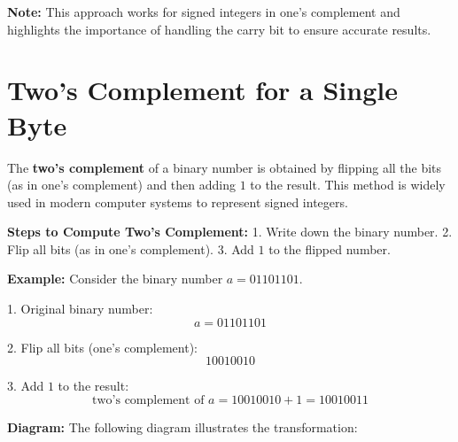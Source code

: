 \documentclass{report}
\begin{document}
\begin{center}
\end{center}

\textbf{Note:} This approach works for signed integers in one's complement and highlights the importance of handling the carry bit to ensure accurate results.

\section{Two's Complement for a Single Byte}

The \textbf{two's complement} of a binary number is obtained by flipping all the bits (as in one's complement) and then adding \(1\) to the result. This method is widely used in modern computer systems to represent signed integers.

\textbf{Steps to Compute Two's Complement:}
1. Write down the binary number.
2. Flip all bits (as in one's complement).
3. Add \(1\) to the flipped number.

\textbf{Example:}
Consider the binary number \(a = 01101101\).

1. Original binary number:
   \[
   a = 01101101
   \]

2. Flip all bits (one's complement):
   \[
   10010010
   \]

3. Add \(1\) to the result:
   \[
   \text{two's complement of } a = 10010010 + 1 = 10010011
   \]

\textbf{Diagram:}
The following diagram illustrates the transformation:
\end{document}
